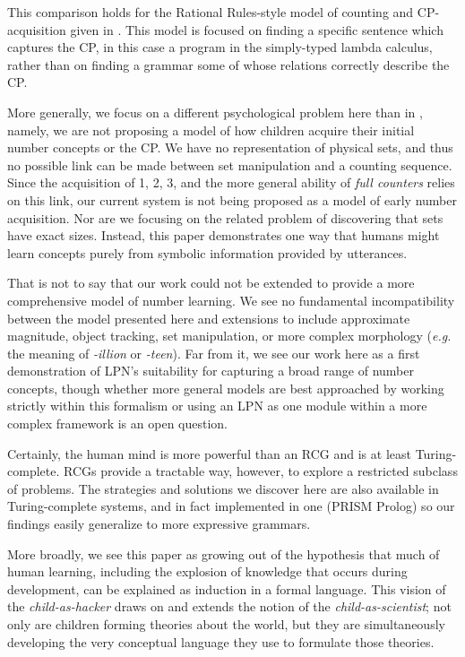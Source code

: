 \documentclass[10pt,letterpaper]{article}
\begin{document}
This comparison holds for the Rational Rules-style model of counting
and CP-acquisition given in \citep{PianGoodTen2012}. This model is
focused on finding a specific sentence which captures the CP, in this
case a program in the simply-typed lambda calculus, rather than on
finding a grammar some of whose relations correctly describe the CP.

More generally, we focus on a different psychological problem here
than in \citep{PianGoodTen2012}, namely, we are not proposing a model
of how children acquire their initial number concepts or the CP. We
have no representation of physical sets, and thus no possible link can
be made between set manipulation and a counting sequence. Since the
acquisition of 1, 2, 3, and the more general ability of \emph{full
  counters} relies on this link, our current system is not being
proposed as a model of early number acquisition. Nor are we focusing
on the related problem of discovering that sets have exact sizes.
Instead, this paper demonstrates one way that humans might learn
concepts purely from symbolic information provided by utterances.

That is not to say that our work could not be extended to provide a
more comprehensive model of number learning. We see no fundamental
incompatibility between the model presented here and extensions to
include approximate magnitude, object tracking, set manipulation, or
more complex morphology ({\it e.g.} the meaning of \emph{-illion} or
\emph{-teen}). Far from it, we see our work here as a first
demonstration of LPN's suitability for capturing a broad range of
number concepts, though whether more general models are best
approached by working strictly within this formalism or using an LPN
as one module within a more complex framework is an open question.

Certainly, the human mind is more powerful than an RCG and is at least
Turing-complete. RCGs provide a tractable way, however, to explore a
restricted subclass of problems. The strategies and solutions we
discover here are also available in Turing-complete systems, and in
fact implemented in one (PRISM Prolog) so our findings easily
generalize to more expressive grammars.

More broadly, we see this paper as growing out of the hypothesis that
much of human learning, including the explosion of knowledge that
occurs during development, can be explained as induction in a formal
language. This vision of the \emph{child-as-hacker} draws on and
extends the notion of the \emph{child-as-scientist}; not only are
children forming theories about the world, but they are simultaneously
developing the very conceptual language they use to formulate those
theories.
\end{document}
